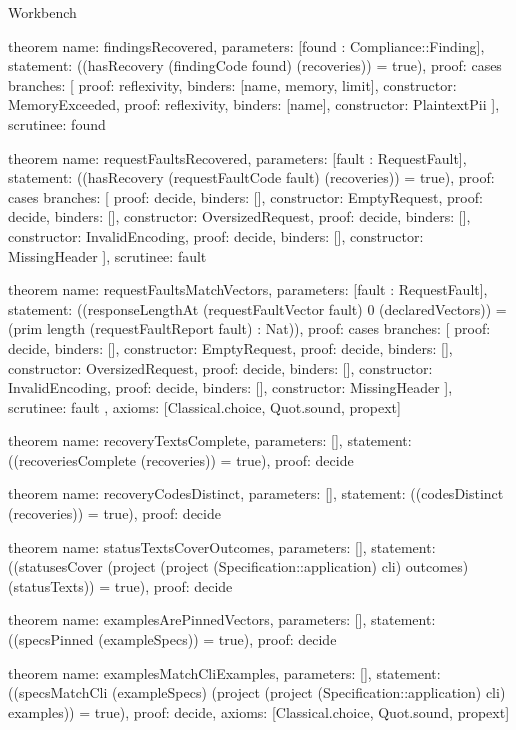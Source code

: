 \begin{lexlean}{Workbench}
\begin{semanticmodule}
theorem{
  name: findingsRecovered,
  parameters: [found : Compliance::Finding],
  statement: ((hasRecovery (findingCode found) (recoveries)) = true),
  proof: cases{
    branches: [
      {proof: reflexivity{}, binders: [name, memory, limit], constructor: MemoryExceeded},
      {proof: reflexivity{}, binders: [name], constructor: PlaintextPii}
    ],
    scrutinee: found
  }
}

theorem{
  name: requestFaultsRecovered,
  parameters: [fault : RequestFault],
  statement: ((hasRecovery (requestFaultCode fault) (recoveries)) = true),
  proof: cases{
    branches: [
      {proof: decide{}, binders: [], constructor: EmptyRequest},
      {proof: decide{}, binders: [], constructor: OversizedRequest},
      {proof: decide{}, binders: [], constructor: InvalidEncoding},
      {proof: decide{}, binders: [], constructor: MissingHeader}
    ],
    scrutinee: fault
  }
}

theorem{
  name: requestFaultsMatchVectors,
  parameters: [fault : RequestFault],
  statement: ((responseLengthAt (requestFaultVector fault) 0 (declaredVectors)) = (prim length (requestFaultReport fault) : Nat)),
  proof: cases{
    branches: [
      {proof: decide{}, binders: [], constructor: EmptyRequest},
      {proof: decide{}, binders: [], constructor: OversizedRequest},
      {proof: decide{}, binders: [], constructor: InvalidEncoding},
      {proof: decide{}, binders: [], constructor: MissingHeader}
    ],
    scrutinee: fault
  },
  axioms: [Classical.choice, Quot.sound, propext]
}

theorem{
  name: recoveryTextsComplete,
  parameters: [],
  statement: ((recoveriesComplete (recoveries)) = true),
  proof: decide{}
}

theorem{
  name: recoveryCodesDistinct,
  parameters: [],
  statement: ((codesDistinct (recoveries)) = true),
  proof: decide{}
}

theorem{
  name: statusTextsCoverOutcomes,
  parameters: [],
  statement: ((statusesCover (project (project (Specification::application) cli) outcomes) (statusTexts)) = true),
  proof: decide{}
}

theorem{
  name: examplesArePinnedVectors,
  parameters: [],
  statement: ((specsPinned (exampleSpecs)) = true),
  proof: decide{}
}

theorem{
  name: examplesMatchCliExamples,
  parameters: [],
  statement: ((specsMatchCli (exampleSpecs) (project (project (Specification::application) cli) examples)) = true),
  proof: decide{},
  axioms: [Classical.choice, Quot.sound, propext]
}


\end{semanticmodule}
\end{lexlean}
